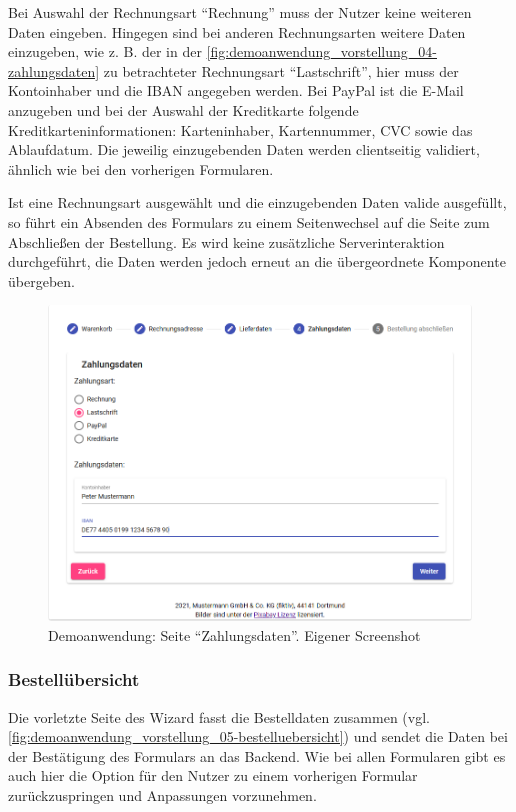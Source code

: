 Bei Auswahl der Rechnungsart \enquote{Rechnung} muss der Nutzer keine weiteren Daten eingeben. Hingegen sind bei anderen Rechnungsarten weitere Daten einzugeben, wie z. B. der in der \autoref{fig:demoanwendung_vorstellung_04-zahlungsdaten} zu betrachteter Rechnungsart \enquote{Lastschrift}, hier muss der Kontoinhaber und die IBAN angegeben werden. Bei PayPal ist die E-Mail anzugeben und bei der Auswahl der Kreditkarte folgende Kreditkarteninformationen: Karteninhaber, Kartennummer, CVC sowie das Ablaufdatum. Die jeweilig einzugebenden Daten werden clientseitig validiert, ähnlich wie bei den vorherigen Formularen.

Ist eine Rechnungsart ausgewählt und die einzugebenden Daten valide ausgefüllt, so führt ein Absenden des Formulars zu einem Seitenwechsel auf die Seite zum Abschließen der Bestellung. Es wird keine zusätzliche Serverinteraktion durchgeführt, die Daten werden jedoch erneut an die übergeordnete Komponente übergeben.

\begin{figure}[H]
	\centering
	\includegraphics[width=0.85\linewidth]{img/04_erstellung-poc/demoanwendung_vorstellung_04-zahlungsdaten.png}
	\caption{Demoanwendung: Seite \enquote{Zahlungsdaten}. Eigener Screenshot}
	\label{fig:demoanwendung_vorstellung_04-zahlungsdaten}
\end{figure}

\subsubsection{Bestellübersicht}

Die vorletzte Seite des Wizard fasst die Bestelldaten zusammen (vgl. \autoref{fig:demoanwendung_vorstellung_05-bestelluebersicht}) und sendet die Daten bei der Bestätigung des Formulars an das Backend. Wie bei allen Formularen gibt es auch hier die Option für den Nutzer zu einem vorherigen Formular zurückzuspringen und Anpassungen vorzunehmen.

